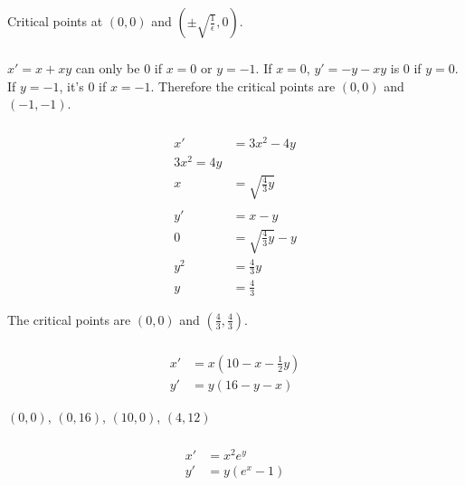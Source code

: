 \documentclass{article}
\begin{document}
Critical points at $(0, 0)$ and $\left( \pm \sqrt{\frac{1}{\epsilon}}, 0 \right)$.

\setcounter{subsubsection}{6}
\subsubsection{}

$x' = x + x y$ can only be $0$ if $x = 0$ or $y = -1$. If $x = 0$, $y' = -y - x y$ is $0$ if $y = 0$. If $y = -1$, it's $0$ if $x = -1$. Therefore the critical points are $(0, 0)$ and $(-1, -1)$.

\setcounter{subsubsection}{8}
\subsubsection{}

\begin{align*}
  x'  & = 3 x^2 - 4 y              \\
  3 x^2 = 4 y                      \\
  x   & = \sqrt{\frac{4}{3} y}     \\ \\
  y'  & = x - y                    \\
  0   & = \sqrt{\frac{4}{3} y} - y \\
  y^2 & = \frac{4}{3} y            \\
  y   & = \frac{4}{3}
\end{align*}

The critical points are $(0, 0)$ and $\left( \frac{4}{3}, \frac{4}{3} \right)$.

\setcounter{subsubsection}{10}
\subsubsection{}

\begin{align*}
  x' & = x \left( 10 - x - \frac{1}{2} y \right) \\
  y' & = y (16 - y - x)
\end{align*}

$(0, 0)$, $(0, 16)$, $(10, 0)$, $(4, 12)$

\setcounter{subsubsection}{12}
\subsubsection{}

\begin{align*}
  x' & = x^2 e^y     \\
  y' & = y (e^x - 1)
\end{align*}
\end{document}
